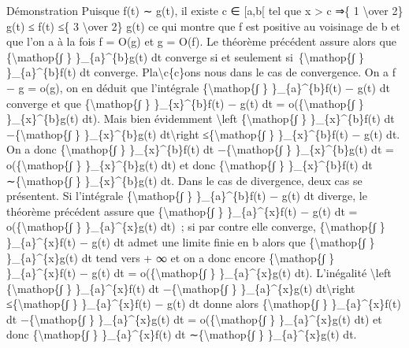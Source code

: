 \documentclass[]{article}
\begin{document}
Démonstration Puisque f(t) ∼ g(t), il existe c ∈ {[}a,b{[} tel que x
\textgreater{} c ⇒\{ 1 \textbackslash{}over 2\} g(t) ≤ f(t) ≤\{ 3
\textbackslash{}over 2\} g(t) ce qui montre que f est positive au
voisinage de b et que l'on a à la fois f = O(g) et g = O(f). Le théorème
précédent assure alors que \{\textbackslash{}mathop\{∫ \}
\}\_\{a\}\^{}\{b\}g(t) dt converge si et seulement
si~\{\textbackslash{}mathop\{∫ \} \}\_\{a\}\^{}\{b\}f(t) dt converge.
Pla\textbackslash{}c\{c\}ons nous dans le cas de convergence. On a
\textbar{}f − g\textbar{} = o(g), on en déduit que l'intégrale
\{\textbackslash{}mathop\{∫ \} \}\_\{a\}\^{}\{b\}\textbar{}f(t) −
g(t)\textbar{} dt converge et que \{\textbackslash{}mathop\{∫ \}
\}\_\{x\}\^{}\{b\}\textbar{}f(t) − g(t)\textbar{} dt =
o(\{\textbackslash{}mathop\{∫ \} \}\_\{x\}\^{}\{b\}g(t) dt). Mais bien
évidemment \textbackslash{}left \textbar{}\{\textbackslash{}mathop\{∫ \}
\}\_\{x\}\^{}\{b\}f(t) dt −\{\textbackslash{}mathop\{∫ \}
\}\_\{x\}\^{}\{b\}g(t) dt\textbackslash{}right
\textbar{}≤\{\textbackslash{}mathop\{∫ \}
\}\_\{x\}\^{}\{b\}\textbar{}f(t) − g(t)\textbar{} dt. On a donc
\{\textbackslash{}mathop\{∫ \} \}\_\{x\}\^{}\{b\}f(t) dt
−\{\textbackslash{}mathop\{∫ \} \}\_\{x\}\^{}\{b\}g(t) dt =
o(\{\textbackslash{}mathop\{∫ \} \}\_\{x\}\^{}\{b\}g(t) dt) et donc
\{\textbackslash{}mathop\{∫ \} \}\_\{x\}\^{}\{b\}f(t) dt
∼\{\textbackslash{}mathop\{∫ \} \}\_\{x\}\^{}\{b\}g(t) dt. Dans le cas
de divergence, deux cas se présentent. Si l'intégrale
\{\textbackslash{}mathop\{∫ \} \}\_\{a\}\^{}\{b\}\textbar{}f(t) −
g(t)\textbar{} dt diverge, le théorème précédent assure que
\{\textbackslash{}mathop\{∫ \} \}\_\{a\}\^{}\{x\}\textbar{}f(t) −
g(t)\textbar{} dt = o(\{\textbackslash{}mathop\{∫ \}
\}\_\{a\}\^{}\{x\}g(t) dt)~; si par contre elle converge,
\{\textbackslash{}mathop\{∫ \} \}\_\{a\}\^{}\{x\}\textbar{}f(t) −
g(t)\textbar{} dt admet une limite finie en b alors que
\{\textbackslash{}mathop\{∫ \} \}\_\{a\}\^{}\{x\}g(t) dt tend vers + ∞
et on a donc encore \{\textbackslash{}mathop\{∫ \}
\}\_\{a\}\^{}\{x\}\textbar{}f(t) − g(t)\textbar{} dt =
o(\{\textbackslash{}mathop\{∫ \} \}\_\{a\}\^{}\{x\}g(t) dt). L'inégalité
\textbackslash{}left \textbar{}\{\textbackslash{}mathop\{∫ \}
\}\_\{a\}\^{}\{x\}f(t) dt −\{\textbackslash{}mathop\{∫ \}
\}\_\{a\}\^{}\{x\}g(t) dt\textbackslash{}right
\textbar{}≤\{\textbackslash{}mathop\{∫ \}
\}\_\{a\}\^{}\{x\}\textbar{}f(t) − g(t)\textbar{} dt donne alors
\{\textbackslash{}mathop\{∫ \} \}\_\{a\}\^{}\{x\}f(t) dt
−\{\textbackslash{}mathop\{∫ \} \}\_\{a\}\^{}\{x\}g(t) dt =
o(\{\textbackslash{}mathop\{∫ \} \}\_\{a\}\^{}\{x\}g(t) dt) et donc
\{\textbackslash{}mathop\{∫ \} \}\_\{a\}\^{}\{x\}f(t) dt
∼\{\textbackslash{}mathop\{∫ \} \}\_\{a\}\^{}\{x\}g(t) dt.
\end{document}

